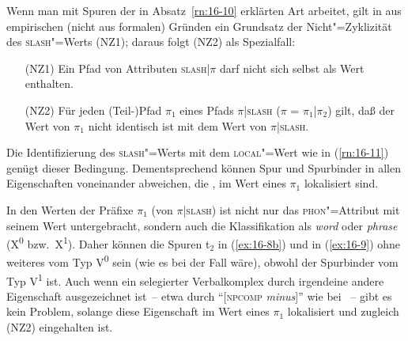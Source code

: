 \documentclass[output=paper]{LSP/langsci}
\begin{document}
\randnum Wenn man mit Spuren der in Absatz~\ref{rn:16-10} erklärten Art arbeitet, gilt in  aus empirischen (nicht aus
formalen) Gründen ein Grundsatz der Nicht"=Zyklizität des \textsc{slash}"=Werts
(NZ1); daraus folgt (NZ2) als Spezialfall:
{
\begin{enumerate}[widest=(NZ2)]
\item[(NZ1)] Ein Pfad von Attributen \textsc{slash}|$\pi$ darf nicht sich selbst als Wert enthalten.
\item[(NZ2)] Für jeden (Teil-)Pfad $\pi_{1}$ eines Pfads $\pi$|\textsc{slash} ($\pi$ = $\pi_{1}$|$\pi_{2}$) gilt, daß der Wert von $\pi_{1}$ nicht identisch ist mit dem Wert von $\pi$|\textsc{slash}.
\end{enumerate}
}
{\randnum}Die Identifizierung des \textsc{slash}"=Werts mit dem
\textsc{local}"=Wert wie in (\ref{rn:16-11}) genügt dieser Bedingung. Dementsprechend
können Spur und Spurbinder in allen Eigenschaften voneinander
abweichen, die , \dash im Wert eines $\pi_{1}$ lokalisiert sind.

\randnum In den Werten der Präfixe $\pi_{1}$ (von $\pi$|\textsc{slash})
ist nicht nur das \textsc{phon}"=Attribut mit seinem Wert untergebracht, sondern
\zb auch die Klassifikation als \textit{word} oder \textit{phrase} (X\textsuperscript{0} bzw.\ X\textsuperscript{1}). Daher
können die Spuren t$_2$ in (\ref{ex:16-8b}) und in (\ref{ex:16-9}) ohne weiteres vom Typ V\textsuperscript{0} sein
(wie es bei \citealt{Kiss1993} der Fall wäre), obwohl der Spurbinder vom Typ V\textsuperscript{1}
ist. Auch wenn ein selegierter Verbalkomplex durch irgendeine andere
Eigenschaft ausgezeichnet ist~-- etwa durch "`[\textsc{npcomp} \textit{minus}]"' wie bei
\citet{HinrichsNakazawa1993}~-- gibt es kein Problem, solange diese Eigenschaft im
Wert eines $\pi_{1}$ lokalisiert und zugleich (NZ2) eingehalten ist.

\nocite{GibsonHickok1993,Gorrell1993,Pickering1991}

\printbibliography[heading=subbibliography,notkeyword=this]
\label{chap-spuren-hpsg-end}
\end{document}
